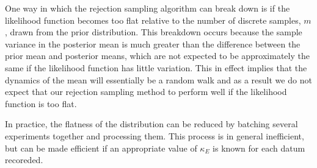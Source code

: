 \documentclass[aps,pra,amsmath,twocolumn,amssymb,superscriptaddress]{revtex4-1}
\begin{document}
One way in which the rejection sampling algorithm can break down is if the likelihood function becomes too flat relative to the number of discrete samples, $m$, drawn from the prior distribution.  This breakdown occurs because the sample variance in the posterior mean is much greater than the difference between the prior mean and posterior means, which are not expected to be approximately the same if the likelihood function has little variation.  This in effect implies that the dynamics of the mean will essentially be a random walk and as a result we do not expect that our rejection sampling method to perform well if the likelihood function is too flat.  

In practice, the flatness of the distribution can be reduced by batching several experiments together and processing them.  This process is in general inefficient, but can be made efficient if an appropriate value of $\kappa_E$ is known for each datum recoreded.
\end{document}
